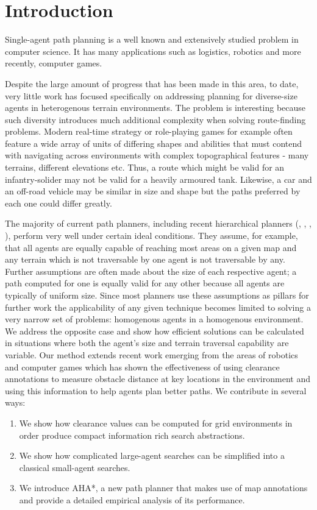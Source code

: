 \section{Introduction}
Single-agent path planning is a well known and extensively studied problem in computer science.
It has many applications such as logistics, robotics and more recently, computer games. 
\par \indent
Despite the large amount of progress that has been made in this area, to date, very little work has focused specifically on addressing planning for diverse-size agents in heterogenous terrain environments. 
The problem is interesting because such diversity introduces much additional complexity when solving route-finding problems.
Modern real-time strategy or role-playing games for example often feature a wide array of units of differing shapes and abilities that must contend with navigating across environments with complex topographical features - many terrains, different elevations etc. 
Thus, a route which might be valid for an infantry-solider may not be valid for a heavily armoured tank. 
Likewise, a car and an off-road vehicle may be similar in size and shape but the paths preferred by each one could differ greatly. 
\par \indent
The majority of current path planners, including recent hierarchical planners (\cite{botea04}, \cite{sturtevant05}, \cite{demyen07}, \cite{geraerts07}), perform very well under certain ideal conditions. 
They assume, for example, that all agents are equally capable of reaching most areas on a given map and any terrain which is not traversable by one agent is not traversable by any. 
Further assumptions are often made about the size of each respective agent; a path computed for one is equally valid for any other because all agents are typically of uniform size. 
Since most planners use these assumptions as pillars for further work the applicability of any given technique becomes limited to solving a very narrow set of problems: homogenous agents in a homogenous environment. \\
We address the opposite case and show how efficient solutions can be calculated in situations where both the agent's size and terrain traversal capability are variable. Our method extends recent work emerging from the areas of robotics and computer games which has shown the effectiveness of using clearance annotations to measure obstacle distance at key locations in the environment and using this information to help agents plan better paths. We contribute in several ways:
\begin{enumerate}
\item{We show how clearance values can be computed for grid environments in order produce compact information rich search abstractions.}
\item{We show how complicated large-agent searches can be simplified into a classical small-agent searches.}
\item{We introduce AHA*, a new path planner that makes use of map annotations and provide a detailed empirical analysis of its performance. }
\end{enumerate} 

